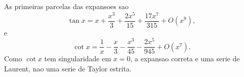 As primeiras parcelas das expansoes sao
\[
\tan x = x + \frac{x^3}{3} + \frac{2x^5}{15} + \frac{17x^7}{315} + O(x^9),
\]
e
\[
\cot x = \frac{1}{x} - \frac{x}{3} - \frac{x^3}{45} - \frac{2x^5}{945} + O(x^7).
\]
Como $\cot x$ tem singularidade em $x=0$, a expansao correta e uma serie de Laurent, nao uma serie de Taylor estrita.

